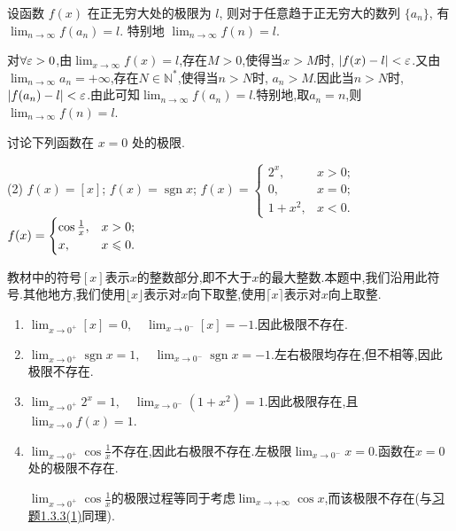 \begin{exercise}[1.3.4]
    设函数 $f(x)$ 在正无穷大处的极限为 $l$, 则对于任意趋于正无穷大的数列 $\{a_n\}$, 有 $\lim_{n \to \infty} f(a_n) = l$. 特别地 $\lim_{n \to \infty} f(n) = l$.
\end{exercise}

\begin{solution}
    [(无穷版本的Heine定理) \ 解]对$\forall \varepsilon > 0$,由$\lim_{x \to \infty} f(x) = l$,存在$M > 0$,使得当$x > M$时, $|f(x) - l| < \varepsilon$.又由$\lim_{n \to \infty} a_n = +\infty$,存在$N\in \mathbb{N}^*$,使得当$n > N$时, $a_n > M$.因此当$n > N$时, $|f(a_n) - l| < \varepsilon$.由此可知$\lim_{n \to \infty} f(a_n) = l$.特别地,取$a_n = n$,则$\lim_{n \to \infty} f(n) = l$.
\end{solution}

\begin{exercise}[1.3.5]
    讨论下列函数在 $x=0$ 处的极限.
    \begin{tasks}[label=(\arabic*)](2)
        \task $f(x) = [x]$;
        \task $f(x) = \operatorname{sgn} x$;
        \task $f(x) = \begin{cases} 2^x, & x > 0; \\ 0, & x = 0; \\ 1+x^2, & x < 0. \end{cases}$
        \task $f(x) = \begin{cases} \cos\frac{1}{x}, & x > 0; \\ x, & x \leqslant 0. \end{cases}$
    \end{tasks}
\end{exercise}

\begin{solution}
    \begin{remark}
        教材中的符号$[x]$表示$x$的整数部分,即不大于$x$的最大整数.本题中,我们沿用此符号.其他地方,我们使用$\lfloor x \rfloor$表示对$x$向下取整,使用$\lceil x \rceil$表示对$x$向上取整.
    \end{remark}
    \begin{enumerate}[(1)]
        \item $\lim_{x \to 0^+} [x] = 0, \quad \lim_{x \to 0^-} [x] = -1$.因此极限不存在.
        \item $\lim_{x \to 0^+} \operatorname{sgn} x = 1, \quad \lim_{x \to 0^-} \operatorname{sgn} x = -1$.左右极限均存在,但不相等,因此极限不存在.
        \item $\lim_{x \to 0^+} 2^x = 1, \quad \lim_{x \to 0^-} (1+x^2) = 1$.因此极限存在,且$\lim_{x \to 0} f(x) = 1$.
        \item $\lim_{x \to 0^+} \cos\frac{1}{x}$不存在,因此右极限不存在.左极限$\lim_{x \to 0^-} x = 0$.函数在$x=0$处的极限不存在. \begin{remark}
                  $\lim_{x \to 0^+} \cos \frac{1}{x}$的极限过程等同于考虑$\lim_{x \to + \infty} \cos x$,而该极限不存在(与\hyperref[exe:1.3.3]{习题1.3.3(1)}同理).
              \end{remark}
    \end{enumerate}
\end{solution}

